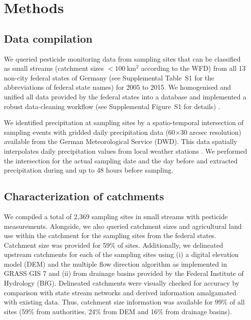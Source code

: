 \section{Methods}
\subsection{Data compilation}
We queried pesticide monitoring data from sampling sites that can be classified as small streams (catchment sizes $\mathrm{< 100~km^2}$ according to the WFD) from all 13 non-city federal states of Germany (see Supplemental Table~S1 for the abbreviations of federal state names) for 2005 to 2015.
We homogenised and unified all data provided by the federal states into a database and implemented a robust data-cleaning workflow (see Supplemental Figure~S1 for details) \citep{poisot_best_2015}.

We identified precipitation at sampling sites by a spatio-temporal intersection of sampling events with gridded daily precipitation data (60$\times$30 arcsec resolution) available from the German Meteorological Service (DWD).
This data spatially interpolates daily precipitation values from local weather stations \citep{rauthe_central_2013}. 
We performed the intersection for the actual sampling date and the day before and extracted precipitation during and up to 48 hours before sampling. 

\subsection{Characterization of catchments}
We compiled a total of 2,369 sampling sites in small streams with pesticide measurements. %
Alongside, we also queried catchment sizes and agricultural land use within the catchment for the sampling sites from the federal states. %
Catchment size was provided for 59\% of sites. 
Additionally, we delineated upstream catchments for each of the sampling sites using (i) a digital elevation model (DEM) \citep{eea_digital_2013} and the multiple flow direction algorithm \citep{holmgren_multiple_1994} as implemented in GRASS GIS 7 \citep{neteler_grass_2012} and (ii) from drainage basins provided by the Federal Institute of Hydrology (BfG). 
Delineated catchments were visually checked for accuracy by comparison with state stream networks and derived information amalgamated with existing data.
Thus, catchment size information was available for 99\% of all sites (59\% from authorities, 24\% from DEM and 16\% from drainage basins). 

